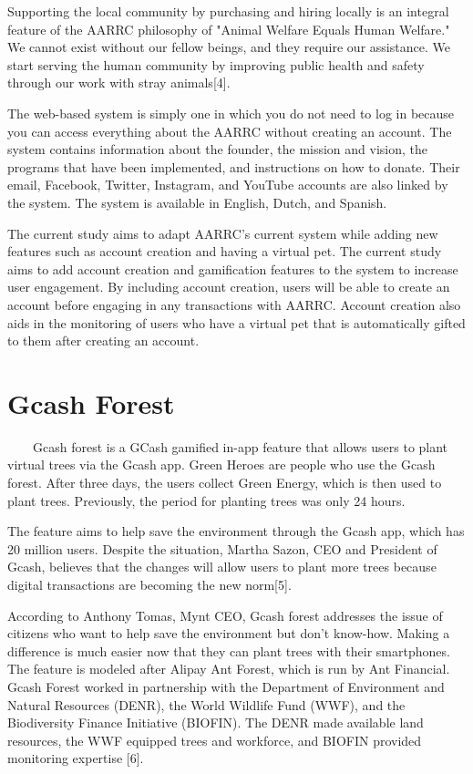 Supporting the local community by purchasing and hiring locally is an integral feature of the AARRC philosophy of "Animal Welfare Equals Human Welfare." We cannot exist without our fellow beings, and they require our assistance. We start serving the human community by improving public health and safety through our work with stray animals[4].

The web-based system is simply one in which you do not need to log in because you can access everything about the AARRC without creating an account. The system contains information about the founder, the mission and vision, the programs that have been implemented, and instructions on how to donate. Their email, Facebook, Twitter, Instagram, and YouTube accounts are also linked by the system. The system is available in English, Dutch, and Spanish.

The current study aims to adapt AARRC's current system while adding new features such as account creation and having a virtual pet. The current study aims to add account creation and gamification features to the system to increase user engagement. By including account creation, users will be able to create an account before engaging in any transactions with AARRC. Account creation also aids in the monitoring of users who have a virtual pet that is automatically gifted to them after creating an account.

\section{Gcash Forest}

~~~~Gcash forest is a GCash gamified in-app feature that allows users to plant virtual trees via the Gcash app. Green Heroes are people who use the Gcash forest. After three days, the users collect Green Energy, which is then used to plant trees. Previously, the period for planting trees was only 24 hours.

The feature aims to help save the environment through the Gcash app, which has 20 million users. Despite the situation, Martha Sazon, CEO and President of Gcash, believes that the changes will allow users to plant more trees because digital transactions are becoming the new norm[5].

According to Anthony Tomas, Mynt CEO, Gcash forest addresses the issue of citizens who want to help save the environment but don't know-how. Making a difference is much easier now that they can plant trees with their smartphones. The feature is modeled after Alipay Ant Forest, which is run by Ant Financial. Gcash Forest worked in partnership with the Department of Environment and Natural Resources (DENR), the World Wildlife Fund (WWF), and the Biodiversity Finance Initiative (BIOFIN). The DENR made available land resources, the WWF equipped trees and workforce, and BIOFIN provided monitoring expertise [6].

